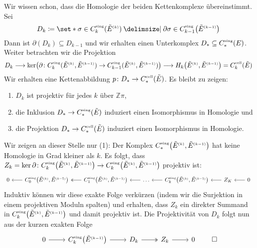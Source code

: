 \begin{beweis}
	Wir wissen schon, dass die Homologie der beiden Kettenkomplexe übereinstimmt.
	Sei 
	\[
		D_k \coloneqq \set*{\sigma \in C_k^\sing(\tilde{E}^\ssbrace{k}) \given \partial \sigma \in C^\sing_{k-1} \enbrace*{\tilde{E}^\ssbrace{k-1}}}
	\]
	Dann ist $\partial(D_k) \subseteq D_{k-1}$ und wir erhalten einen Unterkomplex $D_* \subseteq C_*^\sing(E)$.
	Weiter betrachten wir die Projektion 
	\[
		D_k \longrightarrow \ker \enbrace*{\partial \colon C_k^\sing \enbrace{\tilde{E}^\ssbrace{k}, \tilde{E}^\ssbrace{k-1}} \to C^\sing_{k-1} \enbrace{\tilde{E}^\ssbrace{k}, \tilde{E}^\ssbrace{k-1}}} \longrightarrow H_k \enbrace*{\tilde{E}^\ssbrace{k}, \tilde{E}^\ssbrace{k-1}} = C_k^{\cell}(\tilde{E})
	\]
	Wir erhalten eine Kettenabbildung $p \colon D_* \to C_*^{\cell}(\tilde{E})$.
	Es bleibt zu zeigen:
	\begin{enumerate}[(1),itemsep=1pt]
		\item $D_k$ ist projektiv für jedes $k$ über $\mathbb{Z}\pi$,
		\item die Inklusion $D_* \to C_*^\sing(\tilde{E})$ induziert einen Isomorphismus in Homologie und
		\item die Projektion $D_* \to C_*^{\cell}(\tilde{E})$ induziert einen Isomorphismus in Homologie.
	\end{enumerate}
	Wir zeigen an dieser Stelle nur (1): 
	Der Komplex $C^\sing_* \enbrace*{\tilde{E}^\ssbrace{k}, \tilde{E}^\ssbrace{k-1}}$ hat keine Homologie in Grad kleiner als $k$.
	Es folgt, dass $Z_k = \ker \partial \colon C^\sing_k\enbrace*{\tilde{E}^\ssbrace{k}, \tilde{E}^\ssbrace{k-1}} \to C^\sing_k \enbrace*{\tilde{E}^\ssbrace{k}, \tilde{E}^\ssbrace{k-1}}$ projektiv ist:
	\[
		\begin{tikzcd}[sep=1.9em]
			0 & C_0^\sing \enbrace*{\tilde{E}^\ssbrace{k},\tilde{E}^\ssbrace{k-1}} \lar & C_1^\sing\enbrace*{\tilde{E}^\ssbrace{k},\tilde{E}^\ssbrace{k-1}} \lar[two heads]& \ldots \lar & C_k^\sing \enbrace*{\tilde{E}^\ssbrace{k},\tilde{E}^\ssbrace{k-1}} \lar & Z_K \lar & 0 \lar 
		\end{tikzcd}
	\]
	Induktiv können wir diese exakte Folge verkürzen (indem wir die Surjektion in einem projektiven Moduln spalten) und erhalten, dass $Z_k$ ein direkter Summand in $C^\sing_k \enbrace*{\tilde{E}^\ssbrace{k},\tilde{E}^\ssbrace{k-1}}$ und damit projektiv ist.
	Die Projektivität von $D_k$ folgt nun aus der kurzen exakten Folge
	\[
		\begin{tikzcd}
			0 \rar & C^\sing_k \enbrace*{\tilde{E}^\ssbrace{k-1}}\rar & D_k \rar[two heads] & Z_k \rar & 0 
		\end{tikzcd} \qedhere
	\]
\end{beweis}

